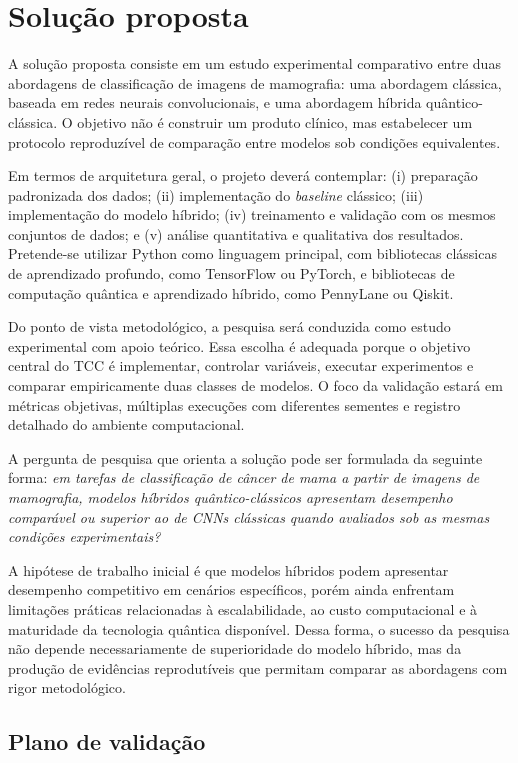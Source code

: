 \documentclass[
    12pt,
    openright,
    oneside,
    a4paper,
    english,
    brazil
]{abntex2}
\begin{document}
\section{Solução proposta}
\label{sec:solucao}

A solução proposta consiste em um estudo experimental comparativo entre duas abordagens de classificação de imagens de mamografia: uma abordagem clássica, baseada em redes neurais convolucionais, e uma abordagem híbrida quântico-clássica. O objetivo não é construir um produto clínico, mas estabelecer um protocolo reproduzível de comparação entre modelos sob condições equivalentes.

Em termos de arquitetura geral, o projeto deverá contemplar: (i) preparação padronizada dos dados; (ii) implementação do \textit{baseline} clássico; (iii) implementação do modelo híbrido; (iv) treinamento e validação com os mesmos conjuntos de dados; e (v) análise quantitativa e qualitativa dos resultados. Pretende-se utilizar Python como linguagem principal, com bibliotecas clássicas de aprendizado profundo, como TensorFlow ou PyTorch, e bibliotecas de computação quântica e aprendizado híbrido, como PennyLane ou Qiskit.

Do ponto de vista metodológico, a pesquisa será conduzida como estudo experimental com apoio teórico. Essa escolha é adequada porque o objetivo central do TCC é implementar, controlar variáveis, executar experimentos e comparar empiricamente duas classes de modelos. O foco da validação estará em métricas objetivas, múltiplas execuções com diferentes sementes e registro detalhado do ambiente computacional.

A pergunta de pesquisa que orienta a solução pode ser formulada da seguinte forma: \textit{em tarefas de classificação de câncer de mama a partir de imagens de mamografia, modelos híbridos quântico-clássicos apresentam desempenho comparável ou superior ao de CNNs clássicas quando avaliados sob as mesmas condições experimentais?}

A hipótese de trabalho inicial é que modelos híbridos podem apresentar desempenho competitivo em cenários específicos, porém ainda enfrentam limitações práticas relacionadas à escalabilidade, ao custo computacional e à maturidade da tecnologia quântica disponível. Dessa forma, o sucesso da pesquisa não depende necessariamente de superioridade do modelo híbrido, mas da produção de evidências reprodutíveis que permitam comparar as abordagens com rigor metodológico.

\subsection*{Plano de validação}
\end{document}
